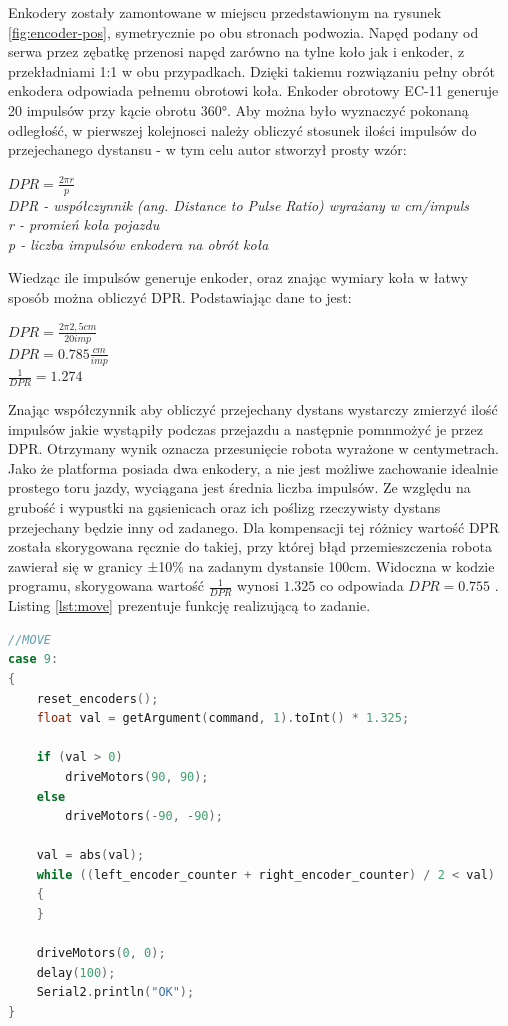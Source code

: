 Enkodery zostały zamontowane w miejscu przedstawionym na rysunek \ref{fig:encoder-pos}, symetrycznie po obu stronach podwozia. Napęd podany od serwa przez zębatkę przenosi napęd zarówno na tylne koło jak i enkoder, z przekładniami 1:1 w obu przypadkach. Dzięki takiemu rozwiązaniu pełny obrót enkodera odpowiada pełnemu obrotowi koła. Enkoder obrotowy EC-11 generuje 20 impulsów przy kącie obrotu 360°. Aby można było wyznaczyć pokonaną odległość, w pierwszej kolejnosci należy obliczyć stosunek ilości impulsów do przejechanego dystansu - w tym celu autor stworzył prosty wzór:

\begin{center}
    $DPR = \frac{2 \pi r}{p}$ \\
    \emph{DPR - współczynnik (ang. Distance to Pulse Ratio) wyrażany w cm/impuls} \\
    \emph{r - promień koła pojazdu} \\
    \emph{p - liczba impulsów enkodera na obrót koła}
\end{center}

Wiedząc ile impulsów generuje enkoder, oraz znając wymiary koła w łatwy sposób można obliczyć DPR. Podstawiając dane to jest:

\begin{center}
    $DPR = \frac{2 \pi 2,5cm}{20imp}$ \\
    $DPR = 0.785 \frac{cm}{imp}$ \\
    $\frac{1}{DPR} = 1.274$
\end{center}

Znając współczynnik aby obliczyć przejechany dystans wystarczy zmierzyć ilość impulsów jakie wystąpiły podczas przejazdu a następnie pomnmożyć je przez DPR. Otrzymany wynik oznacza przesunięcie robota wyrażone w centymetrach. Jako że platforma posiada dwa enkodery, a nie jest możliwe zachowanie idealnie prostego toru jazdy, wyciągana jest średnia liczba impulsów. Ze względu na grubość i wypustki na gąsienicach oraz ich poślizg rzeczywisty dystans przejechany będzie inny od zadanego. Dla kompensacji tej różnicy wartość DPR została skorygowana ręcznie do takiej, przy której błąd przemieszczenia robota zawierał się w granicy ±10\% na zadanym dystansie 100cm. Widoczna w kodzie programu, skorygowana wartość $\frac{1}{DPR}$ wynosi $1.325$ co odpowiada $DPR=0.755$ . Listing \ref{lst:move} prezentuje funkcję realizującą to zadanie.


\begin{lstlisting}[basicstyle=\footnotesize\ttfamily,language=c++,caption=Fragment kodu obsługującego polecenie \emph{MOVE},label=lst:move]
//MOVE
case 9:
{
    reset_encoders();
    float val = getArgument(command, 1).toInt() * 1.325;

    if (val > 0)
        driveMotors(90, 90);
    else
        driveMotors(-90, -90);

    val = abs(val);
    while ((left_encoder_counter + right_encoder_counter) / 2 < val)
    {
    }

    driveMotors(0, 0);
    delay(100);
    Serial2.println("OK");
}
\end{lstlisting}

